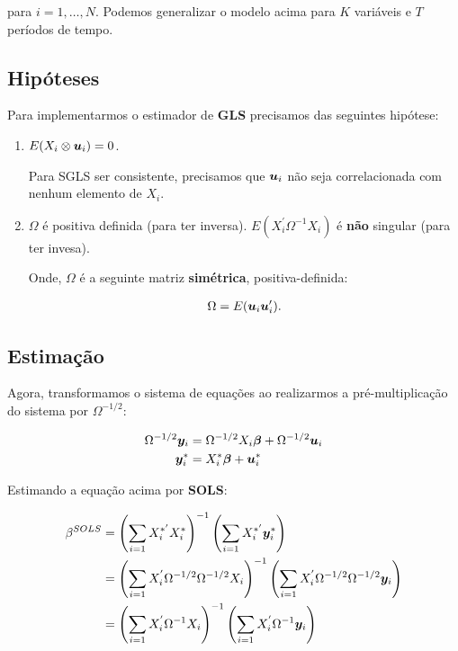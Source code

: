 \documentclass[11pt,oneside,a4paper]{article}
\numberwithin{equation}{section}
\begin{document}
\noindent
para $i = 1, \dots, N$.
Podemos generalizar o modelo acima para $K$ variáveis e $T$ períodos de tempo.

\subsection*{Hipóteses}

Para implementarmos o estimador de \textbf{GLS} precisamos das seguintes hipótese:

\begin{enumerate}
\item %

$E(X_{i} \otimes \boldsymbol{u}_{i}) = 0$.

Para SGLS ser consistente, precisamos que $\boldsymbol{u}_{i}$ não seja correlacionada com nenhum elemento de $X_{i}$.

\item %

$\Omega$ é positiva definida (para ter inversa).
$E(X_{i}^{\prime} \Omega^{-1} X_{i})$ é \textbf{não} singular (para ter invesa).

Onde, $\Omega$ é a seguinte matriz \textbf{simétrica}, positiva-definida:

\vspace{-1.5 em}
\begin{align*}
\Omega = E(\boldsymbol{u}_{i} \boldsymbol{u}_{i}^{\prime}).
\end{align*}
\end{enumerate}

\subsection*{Estimação}

Agora, transformamos o sistema de equações ao realizarmos a pré-multiplicação do sistema por $\Omega^{-1/2}$:

\vspace{-1.5 em}
\begin{align*}
\Omega^{-1/2} \boldsymbol{y}_{i} 
&=
\Omega^{-1/2} X_{i} \boldsymbol{\beta}
+
\Omega^{-1/2} \boldsymbol{u}_{i}
\\
\boldsymbol{y}_{i}^{*}
&=
X_{i}^{*} \boldsymbol{\beta}
+
\boldsymbol{u}^{*}_{i}
\end{align*}

Estimando a equação acima por \textbf{SOLS}:

\vspace{-1.5 em}
\begin{align*}
\beta^{SOLS}
&=
\left( \sum_{i=1} X_{i}^{*'} X_{i}^{*} \right)^{-1}
\left( \sum_{i=1} X_{i}^{*'} \boldsymbol{y}_{i}^{*} \right)
\\
&=
\left( \sum_{i=1} X_{i}^{'} \Omega^{-1/2} \Omega^{-1/2} X_{i} \right)^{-1}
\left( \sum_{i=1} X_{i}^{'} \Omega^{-1/2} \Omega^{-1/2} \boldsymbol{y}_{i} \right)
\\
&=
\left( \sum_{i=1} X_{i}^{'} \Omega^{-1} X_{i} \right)^{-1}
\left( \sum_{i=1} X_{i}^{'} \Omega^{-1} \boldsymbol{y}_{i} \right)
\end{align*}
\end{document}

